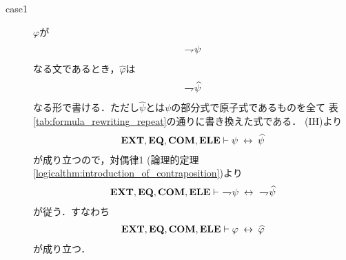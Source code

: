 \begin{sketch}
\begin{description}
\begin{description}
						
						\begin{description}
							\item[case1] $\varphi$が
								\begin{align}
									\rightharpoondown\hspace{-0.25em} \psi
								\end{align}
								なる文であるとき，$\widehat{\varphi}$は
								\begin{align}
									\rightharpoondown\hspace{-0.25em} \widehat{\psi}
								\end{align}
								なる形で書ける．ただし$\widehat{\psi}$とは$\psi$の部分式で原子式であるものを全て
								表\ref{tab:formula_rewriting_repeat}の通りに書き換えた式である．
								(IH)より
								\begin{align}
									\mbox{{\bf EXT}},\mbox{{\bf EQ}},\mbox{\bf COM},\mbox{{\bf ELE}} \vdash \psi \hspace{0.25em}\leftrightarrow\hspace{0.25em} \widehat{\psi}
								\end{align}
								が成り立つので，対偶律1 (論理的定理\ref{logicalthm:introduction_of_contraposition})より
								\begin{align}
									\EXTAX,\EQAX,\COMAX,\ELEAX \vdash\ \negation \psi \lrarrow\ \negation \widehat{\psi}
								\end{align}
								が従う．すなわち
								\begin{align}
									\mbox{{\bf EXT}},\mbox{{\bf EQ}},\mbox{\bf COM},\mbox{{\bf ELE}} \vdash \varphi \hspace{0.25em}\leftrightarrow\hspace{0.25em} \widehat{\varphi}
								\end{align}
								が成り立つ．
								

\end{description}
\end{description}
\end{description}
\end{sketch}
